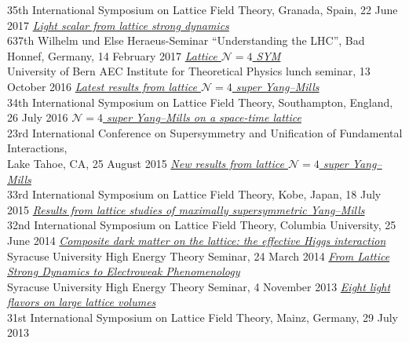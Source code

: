 \begin{spacelist}
\begin{revnumerate}
      35th International Symposium on Lattice Field Theory, Granada, Spain, 22 June 2017
    \pagebreakitem
      \textit{\href{http://www.davidschaich.net/talks/1702BadHonnef.pdf}{Light scalar from lattice strong dynamics}} \\
      637th Wilhelm und Else Heraeus-Seminar ``Understanding the LHC'', Bad Honnef, Germany, 14 February 2017
    \pagebreakitem
      \textit{\href{http://www.davidschaich.net/talks/latticeN4_Bern.pdf}{Lattice $\mathcal N = 4$ SYM}} \\
      University of Bern AEC Institute for Theoretical Physics lunch seminar, 13 October 2016
    \pagebreakitem
      \textit{\href{http://www.davidschaich.net/talks/lattice16.pdf}{Latest results from lattice $\mathcal N = 4$ super Yang--Mills}} \\
      34th International Symposium on Lattice Field Theory, Southampton, England, 26 July 2016
    \pagebreakitem
      \textit{\href{http://www.davidschaich.net/talks/SUSY15.pdf}{$\mathcal N = 4$ super Yang--Mills on a space-time lattice}} \\
      23rd International Conference on Supersymmetry and Unification of Fundamental Interactions, \\ Lake Tahoe, CA, 25 August 2015
    \pagebreakitem
      \textit{\href{http://www.davidschaich.net/talks/lattice15.pdf}{New results from lattice $\mathcal N = 4$ super Yang--Mills}} \\
      33rd International Symposium on Lattice Field Theory, Kobe, Japan, 18 July 2015
    \pagebreakitem
      \textit{\href{http://www.davidschaich.net/talks/lattice14.pdf}{Results from lattice studies of maximally supersymmetric Yang--Mills}} \\
      32nd International Symposium on Lattice Field Theory, Columbia University, 25 June 2014
    \pagebreakitem
      \textit{\href{http://www.davidschaich.net/talks/LSD_SU4_1403.pdf}{Composite dark matter on the lattice: the effective Higgs interaction}} \\
      Syracuse University High Energy Theory Seminar, 24 March 2014
    \pagebreakitem
      \textit{\href{http://www.davidschaich.net/talks/LSD_EFT13.pdf}{From Lattice Strong Dynamics to Electroweak Phenomenology}} \\
      Syracuse University High Energy Theory Seminar, 4 November 2013
    \pagebreakitem
      \textit{\href{http://www.davidschaich.net/talks/lattice13.pdf}{Eight light flavors on large lattice volumes}} \\
      31st International Symposium on Lattice Field Theory, Mainz, Germany, 29 July 2013

\end{revnumerate}
\end{spacelist}
